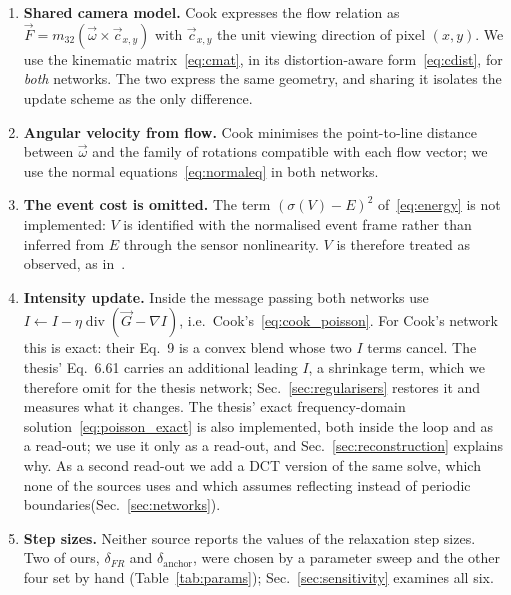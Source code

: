 \documentclass[journal]{IEEEtran}
\newcommand{\Imap}{I}
\newcommand{\Vmap}{V}
\newcommand{\Gmap}{\vec{G}}
\newcommand{\Fmap}{\vec{F}}
\newcommand{\wvec}{\vec{\omega}}
\begin{document}
\begin{enumerate}
\item \textbf{Shared camera model.} Cook expresses the flow relation as
  $\Fmap = m_{32}(\wvec\times\vec c_{x,y})$ with $\vec c_{x,y}$ the unit viewing direction of pixel $(x,y)$.
  We use the kinematic matrix~\eqref{eq:cmat}, in its distortion-aware
  form~\eqref{eq:cdist}, for \emph{both} networks. The two
  express the same geometry, and sharing it isolates the update scheme as the
  only difference.
\item \textbf{Angular velocity from flow.} Cook minimises the point-to-line
  distance between $\wvec$ and the family of rotations compatible with each flow
  vector; we use the normal equations~\eqref{eq:normaleq} in both networks.
\item \textbf{The event cost is omitted.} The term $(\sigma(\Vmap)-E)^2$
  of~\eqref{eq:energy} is not implemented: $\Vmap$ is identified with the
  normalised event frame rather than inferred from $E$ through the sensor
  nonlinearity. $\Vmap$ is therefore treated as observed, as in~\cite{cook2011}.
  
\item \textbf{Intensity update.} Inside the message passing both networks use
  $\Imap \leftarrow \Imap - \eta\operatorname{div}(\Gmap-\nabla \Imap)$, i.e.\
  Cook's~\eqref{eq:cook_poisson}. For Cook's network this is exact: their
  Eq.~9 is a convex blend whose two $\Imap$ terms cancel. The thesis' Eq.~6.61
  carries an additional leading $\Imap$, a shrinkage term, which we therefore
  omit for the thesis network; Sec.~\ref{sec:regularisers} restores it and
  measures what it changes. The thesis' exact frequency-domain
  solution~\eqref{eq:poisson_exact} is also implemented, both inside the loop and as a read-out; we use it only as a read-out, and Sec.~\ref{sec:reconstruction} explains why. As a second read-out we add a DCT version of the same solve, which none of the
  sources uses and which assumes reflecting instead of periodic boundaries(Sec.~\ref{sec:networks}).
\item \textbf{Step sizes.} Neither source reports the values of the relaxation
  step sizes. Two of ours, $\delta_{F\!R}$ and $\delta_{\text{anchor}}$, were
  chosen by a parameter sweep and the other four set by hand
  (Table~\ref{tab:params}); Sec.~\ref{sec:sensitivity} examines all six.
\end{enumerate}
\end{document}
